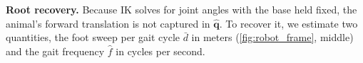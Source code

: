 \documentclass[letterpaper, 10 pt, conference]{ieeeconf}
\newcommand{\averageFootDisplacement}{\bar{d}}
\newcommand{\averageGaitCycle}{\hat{f}}
\begin{document}
\textbf{Root recovery.}
\label{sec:base-recovery}
Because IK solves for joint angles with the base held fixed, the animal's forward translation is not captured in $\hat{\mathbf{q}}$.
To recover it, we estimate two quantities, the foot sweep per gait cycle $\averageFootDisplacement$ in meters (\autoref{fig:robot_frame}, middle) and the gait frequency $\averageGaitCycle$ in cycles per second.
\end{document}
